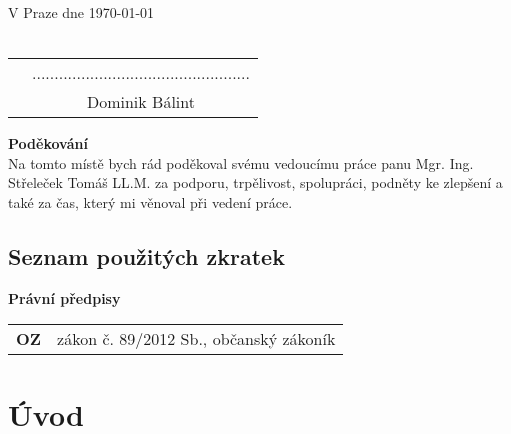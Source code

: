 \documentclass{article}
\begin{document}
\noindent V Praze dne \today\\%
\vspace{10mm} \\
\begin{tabular}{p{6cm}c}
& ................................................. \\
& Dominik Bálint
\end{tabular}

\newpage

\thispagestyle{empty}

\vspace*{\fill}
\noindent \textbf{Poděkování} \\

	Na tomto místě bych rád poděkoval svému vedoucímu práce panu Mgr. Ing. 
Střeleček  Tomáš LL.M. za podporu, trpělivost, spolupráci, podněty ke zlepšení a 
také za čas, který mi věnoval při vedení práce.

\vspace*{\fill}

\newpage
  \thispagestyle{Contents}
  \tableofcontents
  \listoffigures

\newpage
 
\begin{center}
\section{Seznam použitých zkratek}
\end{center}

\vspace{5 mm}

\textbf{Právní předpisy}

\vspace{5 mm}

\begin{tabular}{p{3cm}p{8cm}}
\textbf{OZ} & zákon č. 89/2012 Sb., občanský zákoník	
\end{tabular}

\newpage
  
\section{Úvod}
\end{document}
